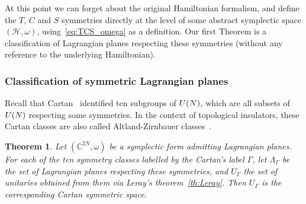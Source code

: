 \documentclass[11pt]{amsart}
\numberwithin{equation}{section} %
\newtheorem{theorem}{Theorem}[section]
\newcommand\1{{\mathds 1}}
\def\C{{\mathbb C}}
\def\cH{{\mathcal H}}
\def\U{{\rm U}}
\begin{document}
At this point we can forget about the original Hamiltonian formalism, and define the $T$, $C$ and $S$ symmetries directly at the level of some abstract symplectic space $(\cH, \omega)$, using~\eqref{eq:TCS_omega} as a definition. Our first Theorem is a classification of Lagrangian planes respecting these symmetries (without any reference to the underlying Hamiltonian).

\subsubsection{Classification of symmetric Lagrangian planes}

Recall that Cartan~\cite{Car-26,Car-27} identified ten subgroups of $\U(N)$, which are all subsets of $\U(N)$ respecting some symmetries. In the context of topological insulators, these Cartan classes are also called Altland-Zirnbauer classes~\cite{AltZir-97}. 

\begin{theorem}\label{thm:classification}
    Let $(\C^{2N}, \omega)$ be a symplectic form admitting Lagrangian planes. For each of the ten symmetry classes labelled by the Cartan's label $\Gamma$, let $\Lambda_\Gamma$ be the set of Lagrangian planes respecting these symmetries, and $U_\Gamma$ the set of unitaries obtained from them via Leray's theorem~\ref{th:Leray}. Then $U_\Gamma$ is the corresponding Cartan symmetric space.
\end{theorem}
\end{document}
